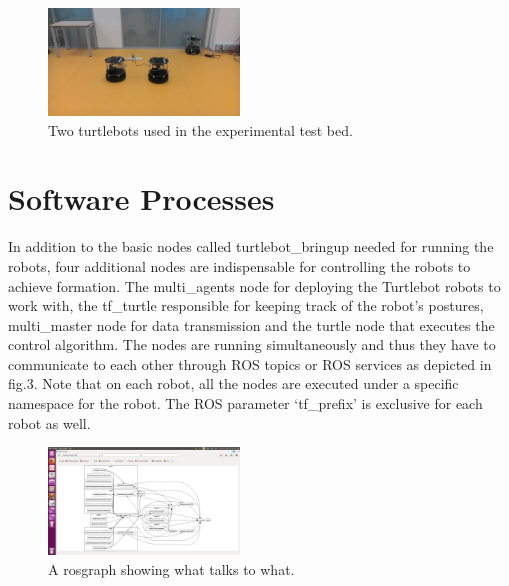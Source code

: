 \documentclass[journal]{IEEEtran}
\begin{document}
\begin{figure}[!h]
\begin{center}
\includegraphics[width=2in]{two.jpg}
\caption{Two turtlebots used in the experimental test bed.}
\end{center}
\label{fig:mypicture2}
\end{figure}









\section{Software Processes}

In addition to the basic nodes called turtlebot{\_}bringup needed for running the robots, four additional nodes are indispensable for controlling the robots to achieve formation. 
The multi{\_}agents node for deploying the Turtlebot robots to work with, the tf{\_}turtle responsible for keeping track of the robot's postures, multi{\_}master node for data transmission and the turtle node that executes the control algorithm. The nodes are running simultaneously and thus they have to communicate to each other through ROS topics or ROS services as depicted in fig.3. Note that on each robot, all the nodes are executed under a specific namespace for the robot. The ROS parameter ‘tf{\_}prefix’ is exclusive for each robot as well.

\begin{figure}[!h]
\begin{center}
\includegraphics[width=2in]{4.png}
\caption{A rosgraph showing what talks to what.}
\end{center}
\label{fig2:mypicture2}
\end{figure}
\end{document}
